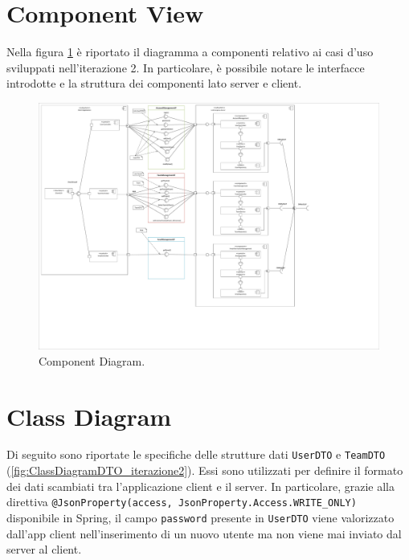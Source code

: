 \section{Component View}
Nella figura \ref{fig:ComponentDiagram_iterazione2} è riportato il diagramma a componenti relativo ai casi d'uso sviluppati nell'iterazione 2. In particolare, è possibile notare le interfacce introdotte e la struttura dei componenti lato server e client.

\begin{figure}[h!]
	\centering
	\includegraphics[width=1\linewidth]{./Iterazione 2/OtherFiles/UML - Component View}
	\caption{Component Diagram.}
	\label{fig:ComponentDiagram_iterazione2}
\end{figure}

\clearpage

\section{Class Diagram}
Di seguito sono riportate le specifiche delle strutture dati \texttt{UserDTO} e \texttt{TeamDTO} (\Fig\ref{fig:ClassDiagramDTO_iterazione2}). Essi sono utilizzati per definire il formato dei dati scambiati tra l'applicazione client e il server. In particolare, grazie alla direttiva \texttt{@JsonProperty(access, JsonProperty.Access.WRITE\_ONLY)} disponibile in Spring, il campo \texttt{password} presente in \texttt{UserDTO} viene valorizzato dall'app client nell'inserimento di un nuovo utente ma non viene mai inviato dal server al client.  

